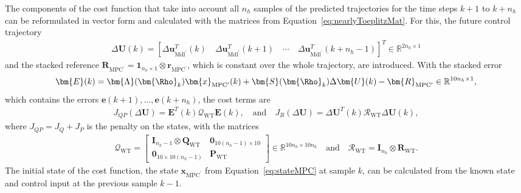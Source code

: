 The components of the cost function that take into account all $n_h$ samples of the predicted trajectories for the time steps $k+1$ to $k + n_h$ can be reformulated in vector form and calculated with the matrices from Equation~\eqref{eq:nearlyToeplitzMat}. For this, the future control trajectory
\begin{align*}
    \Delta \bm{U}(k) = \left[\Delta \bm{u}_{\text{Mdl}^\prime}^T(k) \quad \Delta \bm{u}_{\text{Mdl}^\prime}^T(k+1) \quad \cdots \quad \Delta \bm{u}_{\text{Mdl}^\prime}^T(k+ n_h -1) \right]^T \in \mathbb{R}^{2n_h \times 1}
\end{align*}
and the stacked reference $\bm{R}_{\text{MPC}^\prime} = \bm{1}_{n_h \times 1}\otimes \bm{r}_{\text{MPC}^\prime}$, which is constant over the whole trajectory, are introduced. With the stacked error
\begin{align*}
    \bm{E}(k) = \bm{\Lambda}(\bm{\Rho}_k)\bm{x}_{\text{MPC}^\prime}(k) + \bm{S}(\bm{\Rho}_k) \Delta \bm{U}(k) - \bm{R}_{\text{MPC}^\prime} \in \mathbb{R}^{10 n_h \times 1},
\end{align*}
which contains the errors $\bm{e}(k+1), \dots, \bm{e}(k+n_h)$, the cost terms are
\begin{align*}
    J_{QP}(\Delta \bm{U}) = \bm{E}^T(k) \bm{\mathcal{Q}}_{\text{WT}} \bm{E}(k),\quad \text{and} \quad
    J_R(\Delta \bm{U}) = \Delta \bm{U}^T(k) \bm{\mathcal{R}}_{\text{WT}} \Delta \bm{U}(k),
\end{align*}
where $J_{QP} = J_Q + J_P$ is the penalty on the states, with the matrices
\begin{align*}
    \bm{\mathcal{Q}}_{\text{WT}} = \begin{bmatrix} \bm{I}_{n_h -1} \otimes \bm{Q}_{\text{WT}} & \bm{0}_{10(n_h-1)\times10} \\ \bm{0}_{10\times10(n_h-1)} & \bm{P}_{\text{WT}}\end{bmatrix} \in \mathbb{R}^{10n_h \times 10n_h}\quad\text{and}\quad \bm{\mathcal{R}}_{\text{WT}} = \bm{I}_{n_h} \otimes \bm{R}_{\text{WT}}.
\end{align*}
%
The initial state of the cost function, the state $\bm{x}_{\text{MPC}^\prime}$ from Equation~\eqref{eq:stateMPC} at sample $k$, can be calculated from the known state and control input at the previous sample $k-1$. 

